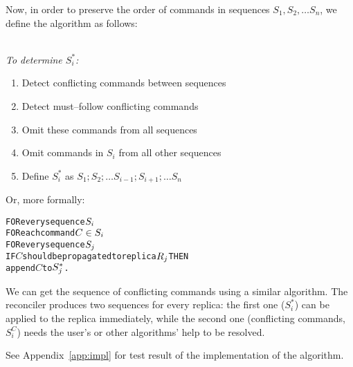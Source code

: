Now, in order to preserve the order of commands in sequences 
\(S_1, S_2, \ldots S_n\), we define the algorithm as follows:
\begin{notrsi}
\\
\emph{To determine \(S_i^*\):}
\begin{enumerate}
\item Detect conflicting commands between sequences
\item Detect must--follow conflicting commands
\item Omit these commands from all sequences
\item Omit commands in \(S_i\) from all other sequences
\item Define \(S_i^*\) as 
\(S_1; S_2; \ldots S_{i-1}; S_{i+1}; \ldots S_n\)
\end{enumerate}
Or, more formally:
\end{notrsi}
\begin{alltt}
FOR every sequence \(S\sb{i}\)
  FOR each command \(C\in S\sb{i}\)  
    FOR every sequence \(S\sb{j}\)
      IF \(C\) should be propagated to replica \(R\sb{j}\) THEN
        append \(C\) to \(S\sb{j}\sp{*}\).
\end{alltt}

We can get the sequence of conflicting commands using a similar
algorithm. The reconciler produces two sequences for every replica: the
first one (\(S_i^*\)) can be applied to the replica immediately, while
the second one (conflicting commands, \(S_i^C\)) needs the user's or
other algorithms' help to be resolved.

See Appendix~\ref{app:impl} for test result of the implementation of the
algorithm.

